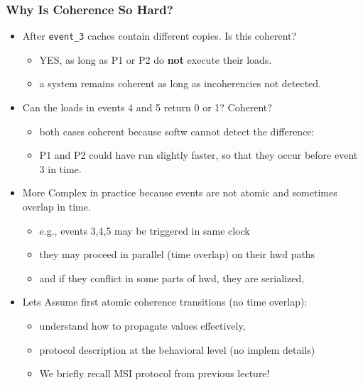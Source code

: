 \documentclass{beamer}
\begin{document}
\begin{frame}[fragile,t]
\frametitle{Why Is Coherence So Hard?}

\begin{itemize}
    \item After {\tt event\_3} caches contain different copies. Is this coherent?\smallskip
        \begin{itemize}
            \item YES, as long as P1 or P2 do {\bf not} execute their loads.
            \item a system remains coherent as long as incoherencies not detected.
        \end  {itemize}\bigskip

    \item Can the loads in events 4 and 5 return 0 or 1? Coherent?\smallskip
        \begin{itemize}
            \item both cases coherent because softw cannot detect the difference:
            \item P1 and P2 could have run slightly faster, so that they occur before event 3 in time.
        \end  {itemize}\medskip

    \item More Complex in practice because events are not atomic and sometimes overlap in time.\smallskip
        \begin{itemize}
            \item e.g., events 3,4,5 may be triggered in same clock
            \item they may proceed in parallel (time overlap)
                    on their hwd paths
            \item and if they conflict in some parts of hwd, they are serialized,
        \end  {itemize}\medskip

    \item Lets Assume first atomic coherence transitions (no time overlap):\smallskip
        \begin{itemize}
            \item understand how to propagate values effectively,
            \item protocol description at the behavioral level (no implem details)
            \item We briefly recall MSI protocol from previous lecture!
        \end  {itemize}\medskip
\end{itemize}

\end{frame}
\end{document}
